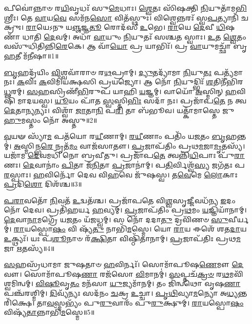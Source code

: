 \setcounter{anuvakam}{0}

𑌪𑍀𑌵𑍋॑𑌨𑍍𑌨𑌾𑍞 𑌰\-\ul{𑌯𑌿}\-𑌵𑍃𑌧𑌃᳴ 𑌸𑍁\-\ul{𑌮𑍇}\-𑌧𑌾𑌃।
\-\ul{𑌶𑍍𑌵𑍇}\-𑌤𑌃 𑌸𑌿᳴𑌷𑌕𑍍𑌤𑌿 \ul{𑌨𑌿}\-𑌯𑍁𑌤𑌾᳴\-𑌮\-\ul{𑌭𑌿}\-𑌶𑍍𑌰𑍀𑌃।
𑌤𑍇 \ul{𑌵𑌾}\-𑌯\-\ul{𑌵𑍇} 𑌸𑌮᳴𑌨\-\ul{𑌸𑍋} 𑌵𑌿𑌤᳴𑌸𑍍𑌥𑍁𑌃।
𑌵𑌿𑌶𑍍𑌵𑍇𑌨𑍍𑌨𑌰𑌃᳴ 𑌸𑍍𑌵\-\ul{𑌪}\-𑌤𑍍𑌯𑌾𑌨𑌿᳴ 𑌚𑌕𑍍𑌰𑍁𑌃।
\-\ul{𑌰𑌾}\-𑌯𑍇𑌽𑌨𑍁 𑌯\-\ul{𑌞𑍍𑌜}\-𑌜𑍍𑌞\-\ul{𑌤𑍂} 𑌰𑍋𑌦᳴𑌸𑍀 \ul{𑌉}\-𑌭𑍇।
\-\ul{𑌰𑌾}\-𑌯𑍇 \ul{𑌦𑍇}\-𑌵𑍀 \ul{𑌧𑌿}\-𑌷𑌣𑌾᳴ 𑌧𑌾𑌤𑌿 \ul{𑌦𑍇}\-𑌵𑌮𑍍।
𑌅𑌧𑌾᳴ \ul{𑌵𑌾}\-𑌯𑍁𑌂 \ul{𑌨𑌿}\-𑌯𑍁𑌤𑌃᳴ 𑌸𑌶𑍍𑌚\-\ul{𑌤} 𑌸𑍍𑌵𑌾𑌃।
\-\ul{𑌉}\-𑌤 \ul{𑌶𑍍𑌵𑍇}\-𑌤𑌂 𑌵𑌸𑍁᳴𑌧𑌿𑌤𑌿𑌨𑍍𑌨𑌿\-\ul{𑌰𑍇}\-𑌕𑍇।
𑌆 𑌵𑌾᳴\-\ul{𑌯𑍋} 𑌪𑍍𑌰 𑌯𑌾𑌭𑌿𑌃᳴।
𑌪𑍍𑌰 \ul{𑌵𑌾}\-𑌯𑍁𑌮𑌚𑍍𑌛𑌾᳴ 𑌬𑍃\-\ul{𑌹}\-𑌤𑍀 𑌮᳴\-\ul{𑌨𑍀}\-𑌷𑌾॥1॥

\-\ul{𑌬𑍃}\-𑌹𑌦𑍍𑌰᳴𑌯𑌿𑌂 \ul{𑌵𑌿}\-𑌶𑍍𑌵𑌵𑌾᳴𑌰𑌾𑍞 𑌰\-\ul{𑌥}\-𑌪𑍍𑌰𑌾𑌮𑍍।
\-\ul{𑌦𑍍𑌯𑍁}\-𑌤𑌦𑍍𑌯𑌾᳴𑌮𑌾 \ul{𑌨𑌿}\-𑌯𑍁\-\ul{𑌤𑌃} 𑌪𑌤𑍍𑌯᳴𑌮𑌾𑌨𑌃।
\-\ul{𑌕}\-𑌵𑌿𑌃 \ul{𑌕}\-𑌵𑌿𑌮𑌿᳴𑌯𑌕𑍍𑌷𑌸𑌿 𑌪𑍍𑌰𑌯𑌜𑍍𑌯𑍋।
𑌆 𑌨𑍋᳴ \ul{𑌨𑌿}\-𑌯𑍁𑌦𑍍𑌭𑌿𑌃᳴ \ul{𑌶}\-𑌤𑌿𑌨𑍀᳴𑌭𑌿𑌰\-\ul{𑌧𑍍𑌵}\-𑌰𑌮𑍍।
\-\ul{𑌸}\-\-\ul{𑌹}\-𑌸𑍍𑌰𑌿𑌣𑍀᳴\-\ul{𑌭𑌿}\-𑌰𑍁𑌪᳴ 𑌯𑌾𑌹𑌿 \ul{𑌯}\-𑌜𑍍𑌞𑌮𑍍।
𑌵𑌾𑌯𑍋᳴ \ul{𑌅}\-𑌸𑍍𑌮𑌿𑌨𑍍 \ul{𑌹}\-𑌵𑌿𑌷𑌿᳴ 𑌮𑌾𑌦𑌯𑌸𑍍𑌵।
\-\ul{𑌯𑍂}\-𑌯𑌂 𑌪𑌾᳴𑌤 \ul{𑌸𑍍𑌵}\-𑌸𑍍𑌤𑌿\-\ul{𑌭𑌿𑌃} 𑌸𑌦𑌾᳴ 𑌨𑌃।
𑌪𑍍𑌰𑌜𑌾᳴𑌪\-\ul{𑌤𑍇} 𑌨 𑌤𑍍𑌵\-\ul{𑌦𑍇}\-𑌤𑌾\-\ul{𑌨𑍍𑌯}\-𑌨𑍍𑌯𑌃।
𑌵𑌿𑌶𑍍𑌵𑌾᳴ \ul{𑌜𑌾}\-𑌤𑌾\-\ul{𑌨𑌿} 𑌪\-\ul{𑌰𑌿} 𑌤𑌾 𑌬᳴𑌭𑍂𑌵।
𑌯𑌤𑍍𑌕𑌾᳴𑌮𑌾𑌸𑍍𑌤𑍇 𑌜𑍁\-\ul{𑌹𑍁}\-𑌮𑌸𑍍𑌤𑌂 𑌨𑍋᳴ 𑌅𑌸𑍍𑌤𑍁॥2॥

\-\ul{𑌵}\-𑌯𑍟 𑌸𑍍𑌯𑌾᳴\-\ul{𑌮} 𑌪𑌤᳴𑌯𑍋 𑌰\-\ul{𑌯𑍀}\-𑌣𑌾𑌮𑍍।
\-\ul{𑌰}\-\-\ul{𑌯𑍀}\-𑌣𑌾𑌂 𑌪𑌤𑌿𑌂᳴ 𑌯\-\ul{𑌜}\-𑌤𑌂 \ul{𑌬𑍃}\-𑌹𑌨𑍍𑌤𑌮𑍍॑।
\-\ul{𑌅}\-𑌸𑍍𑌮𑌿𑌨𑍍𑌭\-\ul{𑌰𑍇} 𑌨𑍃𑌤᳴\-\ul{𑌮𑌂} 𑌵𑌾𑌜᳴𑌸𑌾𑌤𑍗।
\-\ul{𑌪𑍍𑌰}\-𑌜𑌾𑌪᳴𑌤𑌿𑌂 𑌪𑍍𑌰𑌥\-\ul{𑌮}\-𑌜𑌾\-\ul{𑌮𑍃}\-𑌤𑌸𑍍𑌯᳴।
𑌯𑌜𑌾᳴𑌮 \ul{𑌦𑍇}\-𑌵𑌮𑌧𑌿᳴ 𑌨𑍋 𑌬𑍍𑌰𑌵𑍀𑌤𑍁।
𑌪𑍍𑌰𑌜𑌾᳴𑌪\-\ul{𑌤𑍇} 𑌤𑍍𑌵𑌨𑍍𑌨𑌿᳴\-\ul{𑌧𑌿}\-𑌪𑌾𑌃 𑌪𑍁᳴\-\ul{𑌰𑌾}\-𑌣𑌃।
\-\ul{𑌦𑍇}\-𑌵𑌾𑌨𑌾𑌂॑ \ul{𑌪𑌿}\-𑌤𑌾 𑌜᳴\-\ul{𑌨𑌿}\-𑌤𑌾 \ul{𑌪𑍍𑌰}\-𑌜𑌾𑌨𑌾॑𑌮𑍍।
𑌪\-\ul{𑌤𑌿}\-𑌰𑍍𑌵𑌿𑌶𑍍𑌵᳴\-\ul{𑌸𑍍𑌯} 𑌜𑌗᳴𑌤𑌃 𑌪\-\ul{𑌰}\-𑌸𑍍𑌪𑌾𑌃।
\-\ul{𑌹}\-𑌵𑌿𑌰𑍍𑌨𑍋᳴ 𑌦𑍇𑌵 𑌵𑌿\-\ul{𑌹}\-𑌵𑍇 𑌜𑍁᳴𑌷𑌸𑍍𑌵।
𑌤\-\ul{𑌵𑍇}\-𑌮𑍇 \ul{𑌲𑍋}\-𑌕𑌾𑌃 \ul{𑌪𑍍𑌰}\-𑌦𑌿\-\ul{𑌶𑍋} 𑌦𑌿𑌶᳴𑌶𑍍𑌚॥3॥

\-\ul{𑌪}\-\-\ul{𑌰𑌾}\-𑌵𑌤𑍋᳴ \ul{𑌨𑌿}\-𑌵𑌤᳴ \ul{𑌉}\-𑌦𑍍𑌵𑌤᳴𑌶𑍍𑌚।
𑌪𑍍𑌰𑌜𑌾᳴𑌪𑌤𑍇 𑌵𑌿\-\ul{𑌶𑍍𑌵}\-𑌸𑍃\-\ul{𑌜𑍍𑌜𑍀}\-𑌵𑌧᳴𑌨𑍍𑌯 \ul{𑌇}\-𑌦𑌂 𑌨𑍋᳴ 𑌦𑍇𑌵।
𑌪𑍍𑌰𑌤𑌿᳴\-𑌹𑌰𑍍𑌯 \ul{𑌹}\-𑌵𑍍𑌯𑌮𑍍।
\-\ul{𑌪𑍍𑌰}\-𑌜𑌾𑌪᳴𑌤𑌿𑌂 𑌪𑍍𑌰\-\ul{𑌥}\-𑌮𑌂 \ul{𑌯}\-𑌜𑍍𑌞𑌿𑌯𑌾᳴𑌨𑌾𑌮𑍍।
\-\ul{𑌦𑍇}\-𑌵𑌾\-\ul{𑌨𑌾}\-𑌮𑌗𑍍𑌰𑍇᳴ 𑌯\-\ul{𑌜}\-𑌤𑌂 𑌯᳴𑌜𑌧𑍍𑌵𑌮𑍍।
𑌸 𑌨𑍋᳴ 𑌦𑌦𑌾\-\ul{𑌤𑍁} 𑌦𑍍𑌰𑌵𑌿᳴𑌣𑍞 \ul{𑌸𑍁}\-𑌵𑍀𑌰𑍍𑌯𑌮𑍍॑।
\-\ul{𑌰𑌾}\-𑌯𑌸𑍍𑌪𑍋\-\ul{𑌷𑌂} 𑌵𑌿 𑌷𑍍𑌯᳴\-\ul{𑌤𑍁} 𑌨𑌾𑌭𑌿᳴\-\ul{𑌮}\-𑌸𑍍𑌮𑍇।
𑌯𑍋 \ul{𑌰𑌾}\-𑌯 𑌈𑌶𑍇᳴ 𑌶𑌤\-\ul{𑌦𑌾}\-𑌯 \ul{𑌉}\-𑌕𑍍𑌥𑍍𑌯𑌃᳴।
𑌯𑌃 𑌪᳴\-\ul{𑌶𑍂}\-𑌨𑌾𑍞 𑌰᳴\-\ul{𑌕𑍍𑌷𑌿}\-𑌤𑌾 𑌵𑌿𑌷𑍍𑌠𑌿᳴𑌤𑌾𑌨𑌾𑌮𑍍।
\-\ul{𑌪𑍍𑌰}\-𑌜𑌾\-𑌪᳴𑌤𑌿𑌃 𑌪𑍍𑌰𑌥\-\ul{𑌮}\-𑌜𑌾 \ul{𑌋}\-𑌤𑌸𑍍𑌯᳴॥4॥

\-\ul{𑌸}\-𑌹𑌸𑍍𑌰᳴𑌧𑌾𑌮𑌾 𑌜𑍁𑌷𑌤𑌾𑍞 \ul{𑌹}\-𑌵𑌿𑌰𑍍𑌨𑌃᳴।
𑌸𑍋𑌮𑌾᳴𑌪𑍂𑌷\-\ul{𑌣𑍇}\-𑌮𑍗 \ul{𑌦𑍇}\-𑌵𑍗।
𑌸𑍋𑌮𑌾᳴𑌪𑍂𑌷\-\ul{𑌣𑌾} 𑌰𑌜᳴𑌸𑍋 \ul{𑌵𑌿}\-𑌮𑌾𑌨𑌮𑍍॑।
\-\ul{𑌸}\-𑌪𑍍𑌤𑌚᳴\-\ul{𑌕𑍍𑌰}\-\-\ul{𑍞} 𑌰\-\ul{𑌥}\-𑌮𑌵𑌿᳴𑌶𑍍𑌵𑌮𑌿𑌨𑍍𑌵𑌮𑍍।
\-\ul{𑌵𑌿}\-\-\ul{𑌷𑍂}\-𑌵𑍃\-\ul{𑌤𑌂} 𑌮𑌨᳴𑌸𑌾 \ul{𑌯𑍁}\-𑌜𑍍𑌯𑌮𑌾᳴𑌨𑌮𑍍।
𑌤𑌂 𑌜𑌿᳴𑌨𑍍𑌵𑌥𑍋 𑌵𑍃𑌷\-\ul{𑌣𑌾} 𑌪𑌞𑍍𑌚᳴𑌰𑌶𑍍𑌮𑌿𑌮𑍍।
\-\ul{𑌦𑌿}\-𑌵𑍍𑌯᳴𑌨𑍍𑌯𑌃 𑌸𑌦᳴𑌨𑌂 \ul{𑌚}\-𑌕𑍍𑌰 \ul{𑌉}\-𑌚𑍍𑌚𑌾।
\-\ul{𑌪𑍃}\-\-\ul{𑌥𑌿}\-𑌵𑍍𑌯𑌾\-\ul{𑌮}\-𑌨𑍍𑌯𑍋 𑌅\-\ul{𑌧𑍍𑌯}\-𑌨𑍍𑌤𑌰𑌿᳴𑌕𑍍𑌷𑍇।
𑌤𑌾\-\ul{𑌵}\-𑌸𑍍𑌮𑌭𑍍𑌯𑌂᳴ 𑌪𑍁\-\ul{𑌰𑍁}\-𑌵𑌾𑌰𑌂᳴ 𑌪𑍁\-\ul{𑌰𑍁}\-𑌕𑍍𑌷𑍁𑌮𑍍।
\-\ul{𑌰𑌾}\-𑌯𑌸𑍍𑌪𑍋\-\ul{𑌷𑌂} 𑌵𑌿𑌷𑍍𑌯᳴\-\ul{𑌤𑌾}\-𑌨𑍍𑌨𑌾𑌭𑌿᳴\-\ul{𑌮}\-𑌸𑍍𑌮𑍇॥5॥


